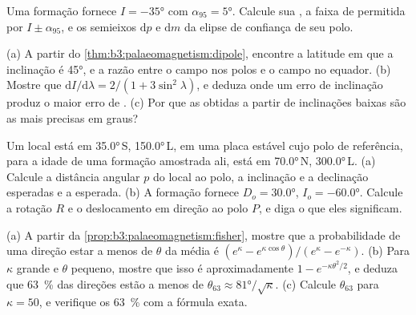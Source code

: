 \begin{exercise}[$\star\star$]\label{exo:b3:palaeomagnetism:9}
Uma formação fornece $I = \ang{-35}$ com $\alpha_{95} = \ang{5}$. Calcule sua
, a faixa de  permitida por $I \pm \alpha_{95}$,
e os semieixos $\mathrm dp$ e $\mathrm dm$ da elipse de confiança de seu
polo.
\end{exercise}

\begin{exercise}[$\star\star\star$]\label{exo:b3:palaeomagnetism:10}
(a) A partir do \cref{thm:b3:palaeomagnetism:dipole}, encontre a latitude em que a
inclinação é \ang{45}, e a razão entre o campo nos polos e o campo no equador. (b)
Mostre que $\mathrm dI/\mathrm d\lambda = 2/(1 + 3\sin^2\lambda)$, e deduza onde
um erro de inclinação produz o maior erro de . (c) Por que as
 obtidas a partir de inclinações baixas são as mais precisas
em graus?
\end{exercise}

\begin{exercise}[$\star\star\star$]\label{exo:b3:palaeomagnetism:11}
Um local está em \ang{35.0}\,S, \ang{150.0}\,L, em uma placa estável cujo polo de
referência, para a idade de uma formação amostrada ali, está em \ang{70.0}\,N,
\ang{300.0}\,L. (a) Calcule a distância angular $p$ do local ao polo, a
inclinação e a declinação esperadas e a  esperada. (b) A formação
fornece $D_o = \ang{30.0}$, $I_o = \ang{-60.0}$. Calcule a
rotação $R$ e o deslocamento em direção ao polo $P$, e diga o que eles significam.
\end{exercise}

\begin{exercise}[$\star\star\star$]\label{exo:b3:palaeomagnetism:12}
(a) A partir da \cref{prop:b3:palaeomagnetism:fisher}, mostre que a probabilidade de uma direção
estar a menos de $\theta$ da média é $(e^\kappa -
e^{\kappa\cos\theta})/(e^\kappa - e^{-\kappa})$. (b) Para $\kappa$ grande e $\theta$ pequeno,
mostre que isso é aproximadamente $1 - e^{-\kappa\theta^2/2}$, e deduza que
\qty{63}{\percent} das direções estão a menos de $\theta_{63} \approx
\ang{81}/\sqrt\kappa$. (c) Calcule $\theta_{63}$ para $\kappa = 50$, e verifique
os \qty{63}{\percent} com a fórmula exata.
\end{exercise}

